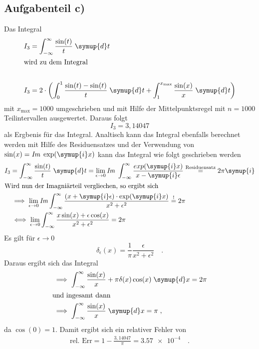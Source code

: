 \subsection*{Aufgabenteil c)}
Das Integral
\begin{align*}
  I_3 &=\int_{-\infty}^{\infty} \frac{\sin(t)}{t} \;\symup{d}t \\
  \intertext{wird zu dem Integral}\\
  I_3 &= 2 \cdot \left( \int_{0}^{1} \frac{\sin(t)-\sin(t)}{t}\;\symup{d}t + \int_{1}^{x_{\text{max}}} \frac{\sin(x)}{x}\;\symup{d}t \right)
\end{align*}
mit $x_{\text{max}}=1000$ umgeschrieben und mit Hilfe der Mittelpunktsregel mit $n=1000$ Teilintervallen ausgewertet.
Daraus folgt
\begin{equation}
  I_3 = 3,14047
\end{equation}
als Ergbenis für das Integral.
Analtisch kann das Integral ebenfalls berechnet werden mit Hilfe des Residuensatzes und der Verwendung von $\sin(x)=\mathit{Im}\; \exp(\symup{i}x)$
kann das Integral wie folgt geschrieben werden
\begin{align*}
  I_3 &=\int_{-\infty}^{\infty} \frac{\sin(t)}{t} \;\symup{d}t = \lim_{\epsilon \to 0} \mathit{Im} \; \int_{-\infty}^{\infty} \frac{exp(\symup{i}x)}{x-\symup{i}\epsilon}
  \overset{\text{Residuensatz}}{=} 2\pi\symup{i} \\
  \intertext{Wird nun der Imagniärteil vergliechen, so ergibt sich}
  &\implies \lim_{\epsilon \to 0} \mathit{Im} \int_{-\infty}^{\infty} \frac{(x+\symup{i}\epsilon)\cdot \exp(\symup{i}x)}{x^2+{\epsilon}^2} \overset{!}{=} 2\pi \\
  &\iff \lim_{\epsilon \to 0} \int_{-\infty}^{\infty} \frac{x\sin(x)+\epsilon\cos(x)}{x^2+{\epsilon}^2} = 2\pi
\end{align*}
Es gilt für $\epsilon\to 0$
\begin{equation*}
  \delta_{\epsilon}(x)= \frac{1}{\pi}\frac{\epsilon}{x^2+{\epsilon}^2}\quad .
\end{equation*}
Daraus ergibt sich das Integral
\begin{align*}
  &\implies \int_{-\infty}^{\infty} \frac{\sin(x)}{x} + \pi\delta(x)\cos(x) \;\symup{d}x = 2 \pi \\
  \intertext{und ingesamt dann}
  &\implies \int_{-\infty}^{\infty} \frac{\sin(x)}{x} \;\symup{d}x = \pi\; ,
\end{align*}
da $\cos(0)=1$.
Damit ergibt sich ein relativer Fehler von
\begin{align*}
  \text{rel. Err} = 1-\frac{3,14047}{\pi} = \num{3.57e-4}\quad.
\end{align*}
